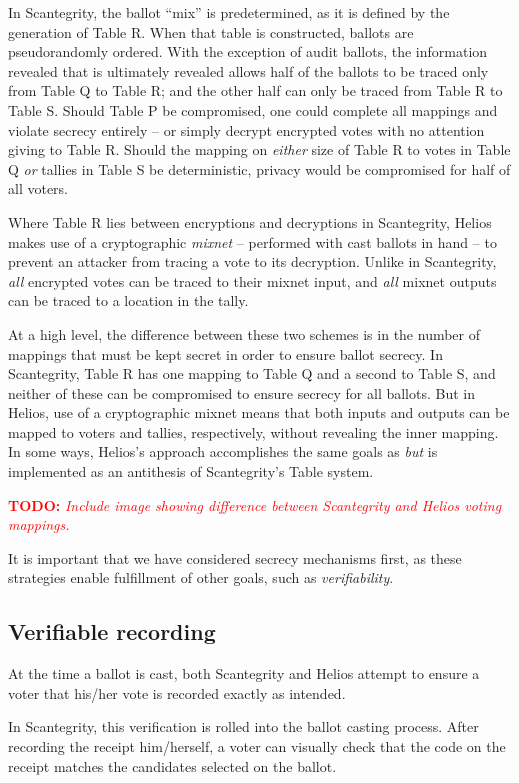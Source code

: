 \documentclass[10pt]{article}
\newcommand{\todo}[1]{\textcolor{red}{\textbf{TODO:} \emph{#1}}}
\newcommand{\term}[1]{\textit{#1}}
\begin{document}
\begin{multicols}{2}
In Scantegrity, the ballot ``mix'' is predetermined, as it is defined by the generation of Table R.
When that table is constructed, ballots are pseudorandomly ordered. With the exception of audit
ballots, the information revealed that is ultimately revealed allows half of the ballots to be
traced only from Table Q to Table R; and the other half can only be traced from Table R to Table S.
Should Table P be compromised, one could complete all mappings and violate secrecy entirely -- or
simply decrypt encrypted votes with no attention giving to Table R. Should the mapping on
\emph{either} size of Table R to votes in Table Q \emph{or} tallies in Table S be deterministic,
privacy would be compromised for half of all voters.

Where Table R lies between encryptions and decryptions in Scantegrity, Helios makes use of a
cryptographic \term{mixnet} -- performed with cast ballots in hand -- to prevent an attacker from
tracing a vote to its decryption. Unlike in Scantegrity, \emph{all} encrypted votes can be traced to
their mixnet input, and \emph{all} mixnet outputs can be traced to a location in the tally.

At a high level, the difference between these two schemes is in the number of mappings that must be
kept secret in order to ensure ballot secrecy. In Scantegrity, Table R has one mapping to Table Q
and a second to Table S, and neither of these can be compromised to ensure secrecy for all ballots.
But in Helios, use of a cryptographic mixnet means that both inputs and outputs can be mapped to
voters and tallies, respectively, without revealing the inner mapping. In some ways, Helios's
approach accomplishes the same goals as \emph{but} is implemented as an antithesis of Scantegrity's
Table system.

\todo{Include image showing difference between Scantegrity and Helios voting mappings.}

It is important that we have considered secrecy mechanisms first, as these strategies enable
fulfillment of other goals, such as \emph{verifiability}.

\subsection{Verifiable recording}

At the time a ballot is cast, both Scantegrity and Helios attempt to ensure a voter that his/her
vote is recorded exactly as intended.

In Scantegrity, this verification is rolled into the ballot casting process. After recording the
receipt him/herself, a voter can visually check that the code on the receipt matches the candidates
selected on the ballot.


\end{multicols}
\end{document}
